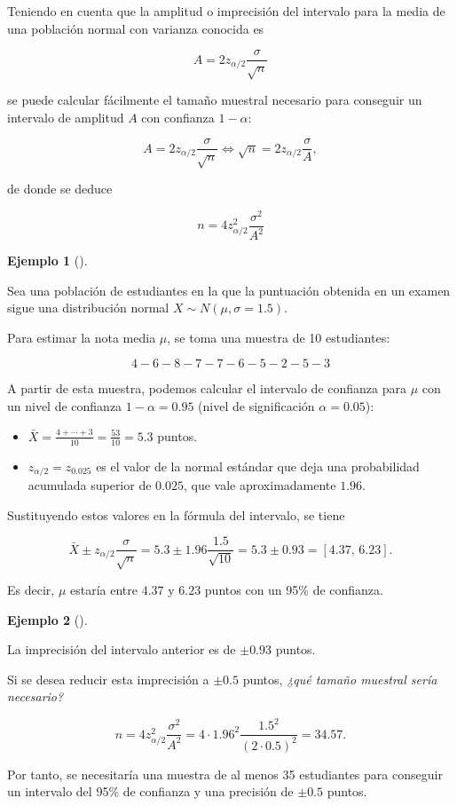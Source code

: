 \documentclass[
  a4paper,
]{scrreport}
\providecommand{\tightlist}{%
  \setlength{\itemsep}{0pt}\setlength{\parskip}{0pt}}\usepackage{longtable,booktabs,array}
\theoremstyle{definition}
\theoremstyle{definition}
\newtheorem{example}{Ejemplo}[chapter]
\theoremstyle{plain}
\theoremstyle{remark}
\begin{document}
Teniendo en cuenta que la amplitud o imprecisión del intervalo para la
media de una población normal con varianza conocida es

\[
A= 2 z_{\alpha/2}\frac{\sigma}{\sqrt{n}}
\]

se puede calcular fácilmente el tamaño muestral necesario para conseguir
un intervalo de amplitud \(A\) con confianza \(1-\alpha\):

\[
A= 2 z_{\alpha/2}\frac{\sigma}{\sqrt{n}} \Leftrightarrow \sqrt{n}= 2 z_{\alpha/2}\frac{\sigma}{A},
\]

de donde se deduce

\[
{n = 4 z_{\alpha/2}^2\frac{\sigma^2}{A^2}}
\]

\begin{example}[]\protect\hypertarget{exm-intervalo-confianza-media}{}\label{exm-intervalo-confianza-media}

Sea una población de estudiantes en la que la puntuación obtenida en un
examen sigue una distribución normal \(X\sim N(\mu,\sigma=1.5)\).

Para estimar la nota media \(\mu\), se toma una muestra de 10
estudiantes:

\[
4 - 6 - 8 - 7 - 7 - 6 - 5 - 2 - 5 - 3
\]

A partir de esta muestra, podemos calcular el intervalo de confianza
para \(\mu\) con un nivel de confianza \(1-\alpha=0.95\) (nivel de
significación \(\alpha=0.05\)):

\begin{itemize}
\tightlist
\item
  \(\bar X = \frac{4+\cdots+3}{10}= \frac{53}{10} = 5.3\) puntos.
\item
  \(z_{\alpha/2}=z_{0.025}\) es el valor de la normal estándar que deja
  una probabilidad acumulada superior de \(0.025\), que vale
  aproximadamente \(1.96\).
\end{itemize}

Sustituyendo estos valores en la fórmula del intervalo, se tiene

\[
\bar{X}\pm z_{\alpha/2}\frac{\sigma}{\sqrt{n}} = 5.3\pm 1.96\frac{1.5}{\sqrt{10}} = 5.3\pm 0.93 = \left[4.37,\,6.23\right].
\]

Es decir, \(\mu\) estaría entre \(4.37\) y \(6.23\) puntos con un 95\%
de confianza.

\end{example}

\begin{example}[]\protect\hypertarget{exm-tamaño-muestral-media}{}\label{exm-tamaño-muestral-media}

La imprecisión del intervalo anterior es de \(\pm 0.93\) puntos.

Si se desea reducir esta imprecisión a \(\pm 0.5\) puntos, \emph{¿qué
tamaño muestral sería necesario?}

\[
n = 4 z_{\alpha/2}^2\frac{\sigma^2}{A^2} = 4\cdot 1.96^2\frac{1.5^2}{(2\cdot 0.5)^2} = 34.57.
\]

Por tanto, se necesitaría una muestra de al menos 35 estudiantes para
conseguir un intervalo del 95\% de confianza y una precisión de
\(\pm 0.5\) puntos.

\end{example}
\end{document}

